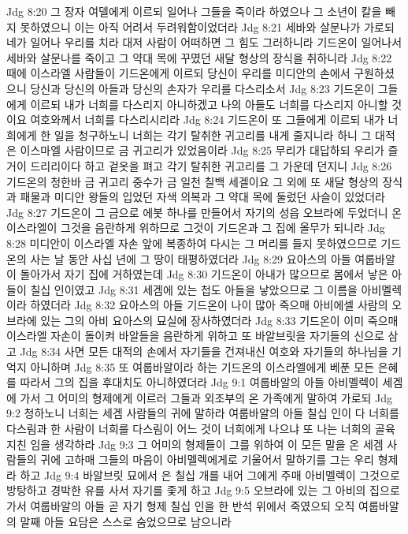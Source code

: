 Jdg 8:20  그 장자 여델에게 이르되 일어나 그들을 죽이라 하였으나 그 소년이 칼을 빼지 못하였으니 이는 아직 어려서 두려워함이었더라
Jdg 8:21  세바와 살문나가 가로되 네가 일어나 우리를 치라 대저 사람이 어떠하면 그 힘도 그러하니라 기드온이 일어나서 세바와 살문나를 죽이고 그 약대 목에 꾸몄던 새달 형상의 장식을 취하니라
Jdg 8:22  때에 이스라엘 사람들이 기드온에게 이르되 당신이 우리를 미디안의 손에서 구원하셨으니 당신과 당신의 아들과 당신의 손자가 우리를 다스리소서
Jdg 8:23  기드온이 그들에게 이르되 내가 너희를 다스리지 아니하겠고 나의 아들도 너희를 다스리지 아니할 것이요 여호와께서 너희를 다스리시리라
Jdg 8:24  기드온이 또 그들에게 이르되 내가 너희에게 한 일을 청구하노니 너희는 각기 탈취한 귀고리를 내게 줄지니라 하니 그 대적은 이스마엘 사람이므로 금 귀고리가 있었음이라
Jdg 8:25  무리가 대답하되 우리가 즐거이 드리리이다 하고 겉옷을 펴고 각기 탈취한 귀고리를 그 가운데 던지니
Jdg 8:26  기드온의 청한바 금 귀고리 중수가 금 일천 칠백 세겔이요 그 외에 또 새달 형상의 장식과 패물과 미디안 왕들의 입었던 자색 의복과 그 약대 목에 둘렀던 사슬이 있었더라
Jdg 8:27  기드온이 그 금으로 에봇 하나를 만들어서 자기의 성읍 오브라에 두었더니 온 이스라엘이 그것을 음란하게 위하므로 그것이 기드온과 그 집에 올무가 되니라
Jdg 8:28  미디안이 이스라엘 자손 앞에 복종하여 다시는 그 머리를 들지 못하였으므로 기드온의 사는 날 동안 사십 년에 그 땅이 태평하였더라
Jdg 8:29  요아스의 아들 여룹바알이 돌아가서 자기 집에 거하였는데
Jdg 8:30  기드온이 아내가 많으므로 몸에서 낳은 아들이 칠십 인이였고
Jdg 8:31  세겜에 있는 첩도 아들을 낳았으므로 그 이름을 아비멜렉이라 하였더라
Jdg 8:32  요아스의 아들 기드온이 나이 많아 죽으매 아비에셀 사람의 오브라에 있는 그의 아비 요아스의 묘실에 장사하였더라
Jdg 8:33  기드온이 이미 죽으매 이스라엘 자손이 돌이켜 바알들을 음란하게 위하고 또 바알브릿을 자기들의 신으로 삼고
Jdg 8:34  사면 모든 대적의 손에서 자기들을 건져내신 여호와 자기들의 하나님을 기억지 아니하며
Jdg 8:35  또 여룹바알이라 하는 기드온의 이스라엘에게 베푼 모든 은혜를 따라서 그의 집을 후대치도 아니하였더라
Jdg 9:1  여룹바알의 아들 아비멜렉이 세겜에 가서 그 어미의 형제에게 이르러 그들과 외조부의 온 가족에게 말하여 가로되
Jdg 9:2  청하노니 너희는 세겜 사람들의 귀에 말하라 여룹바알의 아들 칠십 인이 다 너희를 다스림과 한 사람이 너희를 다스림이 어느 것이 너희에게 나으냐 또 나는 너희의 골육지친 임을 생각하라
Jdg 9:3  그 어미의 형제들이 그를 위하여 이 모든 말을 온 세겜 사람들의 귀에 고하매 그들의 마음이 아비멜렉에게로 기울어서 말하기를 그는 우리 형제라 하고
Jdg 9:4  바알브릿 묘에서 은 칠십 개를 내어 그에게 주매 아비멜렉이 그것으로 방탕하고 경박한 유를 사서 자기를 좇게 하고
Jdg 9:5  오브라에 있는 그 아비의 집으로 가서 여룹바알의 아들 곧 자기 형제 칠십 인을 한 반석 위에서 죽였으되 오직 여룹바알의 말째 아들 요담은 스스로 숨었으므로 남으니라
